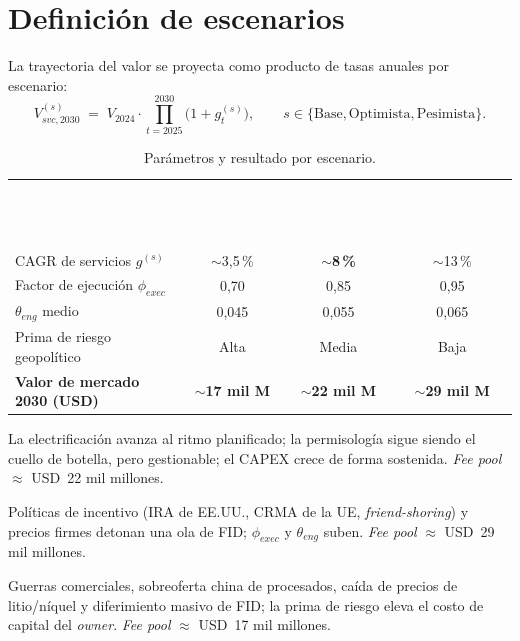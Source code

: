 \documentclass[11pt,letterpaper]{report}
\begin{document}
\section{Definición de escenarios}
La trayectoria del valor se proyecta como producto de tasas anuales por escenario:
\begin{equation}
V_{svc,2030}^{(s)} \;=\; V_{2024}\cdot\prod_{t=2025}^{2030}\bigl(1+g_t^{(s)}\bigr),
\qquad s\in\{\text{Base},\text{Optimista},\text{Pesimista}\}.
\label{eq:escenarios}
\end{equation}

\begin{table}[htbp]
\centering
\caption{Parámetros y resultado por escenario.}
\label{tab:escenarios}
\footnotesize
\renewcommand{\arraystretch}{1.3}
\begin{tabularx}{\textwidth}{@{}Xccc@{}}
\toprule
\rowcolor{tablehead}
\textcolor{white}{\textbf{Parámetro}} & \textcolor{white}{\textbf{Pesimista}} &
\textcolor{white}{\textbf{Base}} & \textcolor{white}{\textbf{Optimista}}\\
\rowcolor{tablehead}
 & \textcolor{white}{\footnotesize Fragmentación} & \textcolor{white}{\footnotesize Transición gradual} & \textcolor{white}{\footnotesize Aceleración Net-Zero}\\
\midrule
CAGR de servicios $g^{(s)}$ & $\sim$3{,}5\,\% & \textbf{$\sim$8\,\%} & $\sim$13\,\%\\
\rowcolor{tablealt}Factor de ejecución $\phi_{exec}$ & 0{,}70 & 0{,}85 & 0{,}95\\
$\theta_{eng}$ medio & 0{,}045 & 0{,}055 & 0{,}065\\
\rowcolor{tablealt}Prima de riesgo geopolítico & Alta & Media & Baja\\
\textbf{Valor de mercado 2030 (USD)} & \textbf{$\sim$17 mil M} & \textbf{$\sim$22 mil M} & \textbf{$\sim$29 mil M}\\
\bottomrule
\end{tabularx}
\end{table}

\begin{description}[leftmargin=1.2em,style=nextline]
\item[Base --- Transición Gradual.] La electrificación avanza al ritmo planificado; la permisología sigue siendo el cuello de
  botella, pero gestionable; el CAPEX crece de forma sostenida. \emph{Fee pool} $\approx$ USD~22 mil millones.
\item[Optimista --- Aceleración Net-Zero.] Políticas de incentivo (IRA de EE.UU., CRMA de la UE, \emph{friend-shoring}) y precios
  firmes detonan una ola de FID; $\phi_{exec}$ y $\theta_{eng}$ suben. \emph{Fee pool} $\approx$ USD~29 mil millones.
\item[Pesimista --- Fragmentación y Proteccionismo.] Guerras comerciales, sobreoferta china de procesados, caída de precios de
  litio/níquel y diferimiento masivo de FID; la prima de riesgo eleva el costo de capital del \emph{owner}.
  \emph{Fee pool} $\approx$ USD~17 mil millones.
\end{description}
\end{document}
